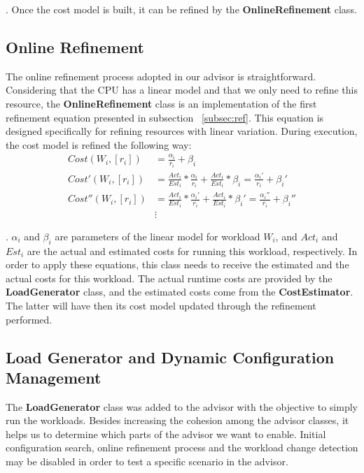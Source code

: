 . Once the cost model is built, it can be refined by the \textbf{OnlineRefinement} class.

\subsection{Online Refinement}

The online refinement process adopted in our advisor is straightforward. Considering that the CPU has a linear model and that we only need to refine this resource, the \textbf{OnlineRefinement} class  is an implementation of the first refinement equation presented in subsection ~\ref{subsec:ref}. This equation is designed specifically for refining resources with linear variation. During execution, the cost model is refined the following way:
\begin{equation}
 \begin{split}
   Cost(W_{i}, [r_{i}]) & = \frac{\alpha_{i}}{r_{i}} +\beta_{i} \\
   Cost'(W_{i}, [r_{i}]) & = \frac{Act_{i}}{Est_{i}} * \frac{\alpha_{i}}{r_{i}} + \frac{Act_{i}}{Est_{i}} * \beta_{i} = \frac{\alpha_{i}'}{r_{i}} +\beta_{i}' \\
   Cost''(W_{i}, [r_{i}]) & = \frac{Act_{i}}{Est_{i}} * \frac{\alpha_{i}'}{r_{i}} + \frac{Act_{i}}{Est_{i}} * \beta_{i}' = \frac{\alpha_{i}''}{r_{i}} +\beta_{i}'' \\
    & \vdots
 \end{split}
\end{equation}

 . $\alpha_{i}$ and $\beta_{i}$ are parameters of the linear model for workload $W_{i}$, and $Act_{i}$ and $Est_{i}$ are the actual and estimated costs for running this workload, respectively. In order to apply these equations, this class needs to receive the estimated and the actual costs for this workload. The actual runtime costs are provided by the \textbf{LoadGenerator} class, and the estimated costs come from the \textbf{CostEstimator}. The latter will have then its cost model updated through the refinement performed.

\subsection{Load Generator and Dynamic Configuration Management}

The \textbf{LoadGenerator} class was added to the advisor with the objective to simply run the workloads. Besides increasing the cohesion among the advisor classes, it helps us to determine which parts of the advisor we want to enable. Initial configuration search, online refinement process and the workload change detection may be disabled in order to test a specific scenario in the advisor.

